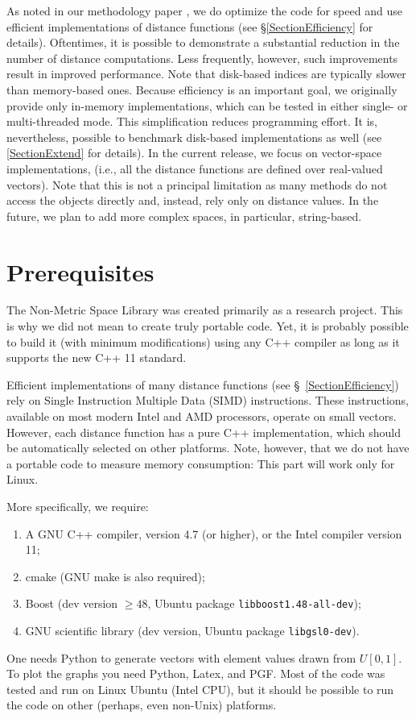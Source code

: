 \documentclass[runningheads,a4paper]{llncs}
\newcommand{\ttt}[1]{\texttt{#1}}
\begin{document}
As noted in our methodology paper \cite{Boytsov_and_Bilegsaikhan:sisap2013},
we do optimize the code for speed and use efficient implementations of distance functions 
(see \S \ref{SectionEfficiency} for details).
Oftentimes, it is possible to demonstrate a substantial reduction in the number
of distance computations. 
Less frequently, however, such improvements result in improved performance.
Note that  disk-based indices are typically
slower than memory-based ones. 
Because efficiency is an important goal,
we originally provide only in-memory implementations,
which can be tested in either single- or multi-threaded mode.
This simplification reduces programming effort.
It is, nevertheless, possible to benchmark disk-based implementations as well (see \ref{SectionExtend} for details).
In the current release, we focus on vector-space implementations,
(i.e., all the distance functions are defined over real-valued vectors). 
Note that this is not a principal limitation as many methods do not access the objects
directly and, instead, rely only on distance values.
In the future, we plan to add more complex spaces, in particular, string-based.


\section{Prerequisites}
The Non-Metric Space Library was created primarily as a research project.
This is why we did not mean to create truly portable code.
Yet, it is probably possible to build it (with minimum modifications) 
using any C++ compiler as long as it supports the new C++ 11 standard.

Efficient implementations of many distance functions (see \S~\ref{SectionEfficiency})
rely on Single Instruction Multiple Data (SIMD) instructions. 
These instructions, available on most modern Intel and AMD processors, 
operate on small vectors. 
However, each distance function has a pure C++ implementation,
which should be automatically selected on other platforms.
Note, however, that we do not have a portable code to measure memory consumption:
This part will work only for Linux. 

More specifically, we require:
\begin{enumerate}
\item A GNU C++ compiler, version 4.7 (or higher), or the Intel compiler version 11;
\item cmake (GNU make is also required);
\item Boost (dev version $\ge48$, Ubuntu package \ttt{libboost1.48-all-dev});
\item GNU scientific library (dev version, Ubuntu package \ttt{libgsl0-dev}).
\end{enumerate}
One needs Python to generate vectors with element values drawn from $U[0,1]$.
To plot the graphs you need Python, Latex, and PGF. 
Most of the code was tested and run on Linux Ubuntu (Intel CPU), 
but it should be possible to run the code on other (perhaps, even non-Unix) platforms.
\end{document}
